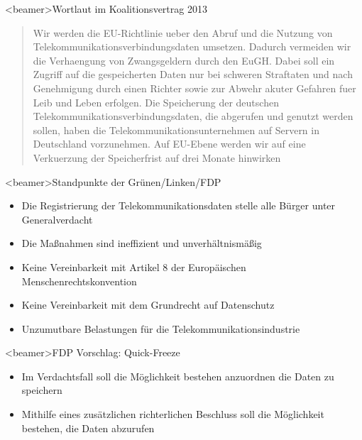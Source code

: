     \begin{frame}<beamer>{Wortlaut im Koalitionsvertrag 2013}
             \begin{quote}
Wir werden die EU-Richtlinie ueber den Abruf und die Nutzung von Telekommunikationsverbindungsdaten umsetzen. Dadurch vermeiden wir die Verhaengung von Zwangsgeldern durch den EuGH. Dabei soll ein Zugriff auf die gespeicherten Daten nur bei schweren Straftaten und nach Genehmigung durch einen Richter sowie zur Abwehr akuter Gefahren fuer Leib und Leben erfolgen. Die Speicherung der deutschen Telekommunikationsverbindungsdaten, die abgerufen und genutzt werden sollen, haben die Telekommunikationsunternehmen auf Servern in Deutschland vorzunehmen. Auf EU-Ebene werden wir auf eine Verkuerzung der Speicherfrist auf drei Monate hinwirken
\end{quote}
   \end{frame}
     
    \begin{frame}<beamer>{Standpunkte der Grünen/Linken/FDP}
       \begin{itemize}
        \item Die Registrierung der Telekommunikationsdaten stelle alle Bürger unter Generalverdacht
        \item Die Maßnahmen sind ineffizient und unverhältnismäßig
        \item Keine Vereinbarkeit mit Artikel 8 der Europäischen Menschenrechtskonvention
        \item Keine Vereinbarkeit mit dem Grundrecht auf Datenschutz
        \item Unzumutbare Belastungen für die Telekommunikationsindustrie
      \end{itemize}
    \end{frame}
        \begin{frame}<beamer>{FDP Vorschlag: Quick-Freeze}
       \begin{itemize}
        \item Im Verdachtsfall soll die Möglichkeit bestehen anzuordnen die Daten zu speichern
        \item Mithilfe eines zusätzlichen richterlichen Beschluss soll die Möglichkeit bestehen, die Daten abzurufen
      \end{itemize}
    \end{frame}

